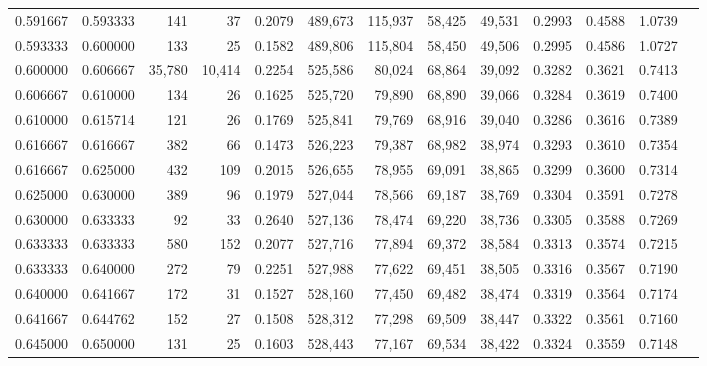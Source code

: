 \begin{tabular}{rrrrrrrrrrrrr}
0.591667 & 0.593333 &    141 &     37 &                                     0.2079 & 489,673 & 115,937 &  58,425 &  49,531 & 0.2993 & 0.4588 & 1.0739 \\
0.593333 & 0.600000 &    133 &     25 &                                     0.1582 & 489,806 & 115,804 &  58,450 &  49,506 & 0.2995 & 0.4586 & 1.0727 \\
0.600000 & 0.606667 & 35,780 & 10,414 &                                     0.2254 & 525,586 &  80,024 &  68,864 &  39,092 & 0.3282 & 0.3621 & 0.7413 \\
0.606667 & 0.610000 &    134 &     26 &                                     0.1625 & 525,720 &  79,890 &  68,890 &  39,066 & 0.3284 & 0.3619 & 0.7400 \\
0.610000 & 0.615714 &    121 &     26 &                                     0.1769 & 525,841 &  79,769 &  68,916 &  39,040 & 0.3286 & 0.3616 & 0.7389 \\
0.616667 & 0.616667 &    382 &     66 &                                     0.1473 & 526,223 &  79,387 &  68,982 &  38,974 & 0.3293 & 0.3610 & 0.7354 \\
0.616667 & 0.625000 &    432 &    109 &                                     0.2015 & 526,655 &  78,955 &  69,091 &  38,865 & 0.3299 & 0.3600 & 0.7314 \\
0.625000 & 0.630000 &    389 &     96 &                                     0.1979 & 527,044 &  78,566 &  69,187 &  38,769 & 0.3304 & 0.3591 & 0.7278 \\
0.630000 & 0.633333 &     92 &     33 &                                     0.2640 & 527,136 &  78,474 &  69,220 &  38,736 & 0.3305 & 0.3588 & 0.7269 \\
0.633333 & 0.633333 &    580 &    152 &                                     0.2077 & 527,716 &  77,894 &  69,372 &  38,584 & 0.3313 & 0.3574 & 0.7215 \\
0.633333 & 0.640000 &    272 &     79 &                                     0.2251 & 527,988 &  77,622 &  69,451 &  38,505 & 0.3316 & 0.3567 & 0.7190 \\
0.640000 & 0.641667 &    172 &     31 &                                     0.1527 & 528,160 &  77,450 &  69,482 &  38,474 & 0.3319 & 0.3564 & 0.7174 \\
0.641667 & 0.644762 &    152 &     27 &                                     0.1508 & 528,312 &  77,298 &  69,509 &  38,447 & 0.3322 & 0.3561 & 0.7160 \\
0.645000 & 0.650000 &    131 &     25 &                                     0.1603 & 528,443 &  77,167 &  69,534 &  38,422 & 0.3324 & 0.3559 & 0.7148 \\

\end{tabular}
